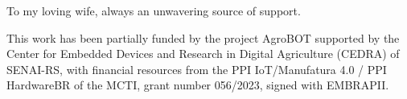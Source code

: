 

\begin{dedicatoria}
  To my loving wife, always an unwavering source of support.
\end{dedicatoria}

\begin{acknowledgements}
  This work has been partially funded by the project AgroBOT supported by the
  Center for Embedded Devices and Research in Digital Agriculture (CEDRA) of
  SENAI-RS, with financial resources from the PPI IoT/Manufatura 4.0 / PPI
  HardwareBR of the MCTI, grant number 056/2023, signed with EMBRAPII.
\end{acknowledgements}